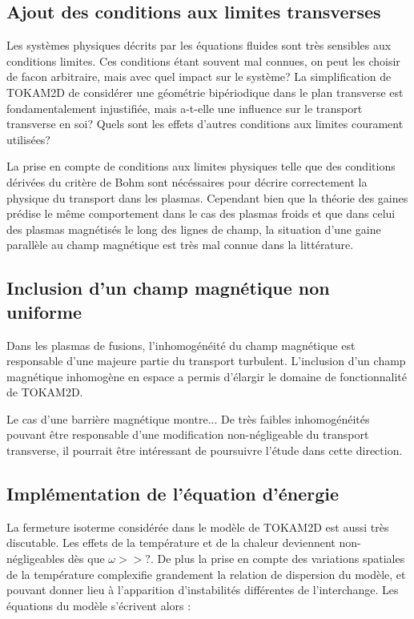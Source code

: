 	\subsection{Ajout des conditions aux limites transverses}
	Les systèmes physiques décrits par les équations fluides sont très sensibles aux conditions limites. Ces conditions étant 
	souvent mal connues, on peut les choisir de facon arbitraire, mais avec quel impact sur le système? La simplification de 
	TOKAM2D de considérer une géométrie bipériodique dans le plan transverse est fondamentalement injustifiée, mais a-t-elle une 
	influence sur le transport transverse en soi? Quels sont les effets d'autres conditions aux limites courament utilisées? 
	
	La prise en compte de conditions aux limites physiques telle que des conditions dérivées du critère de Bohm 
	sont nécéssaires pour décrire correctement la physique du transport dans les plasmas. Cependant bien que la théorie des
	gaines prédise le même comportement dans le cas des plasmas froids et que dans celui des plasmas magnétisés le long des lignes de 
	champ, la situation d'une gaine parallèle au champ magnétique est très mal connue dans la littérature.
	
	\subsection{Inclusion d'un champ magnétique non uniforme}
	Dans les plasmas de fusions, l'inhomogénéité du champ magnétique est responsable d'une majeure partie du transport turbulent.
	L'inclusion d'un champ magnétique inhomogène en espace a permis d'élargir le domaine de fonctionnalité de TOKAM2D. 
	
	Le cas d'une barrière magnétique montre...
	De très faibles inhomogénéités pouvant être responsable d'une modification non-négligeable du transport transverse, il pourrait 
	être intéressant de poursuivre l'étude dans cette direction.
	
	\subsection{Implémentation de l'équation d'énergie}
	La fermeture isoterme considérée dans le modèle de TOKAM2D est aussi très discutable. Les effets de la température et de la chaleur
	deviennent non-négligeables dès que $\omega>>\text{?}$. De plus la prise en compte des variations spatiales de la température
	complexifie grandement la relation de dispersion du modèle, et pouvant donner lieu à l'apparition d'instabilités différentes de 
	l'interchange.
	Les équations du modèle s'écrivent alors :
	
